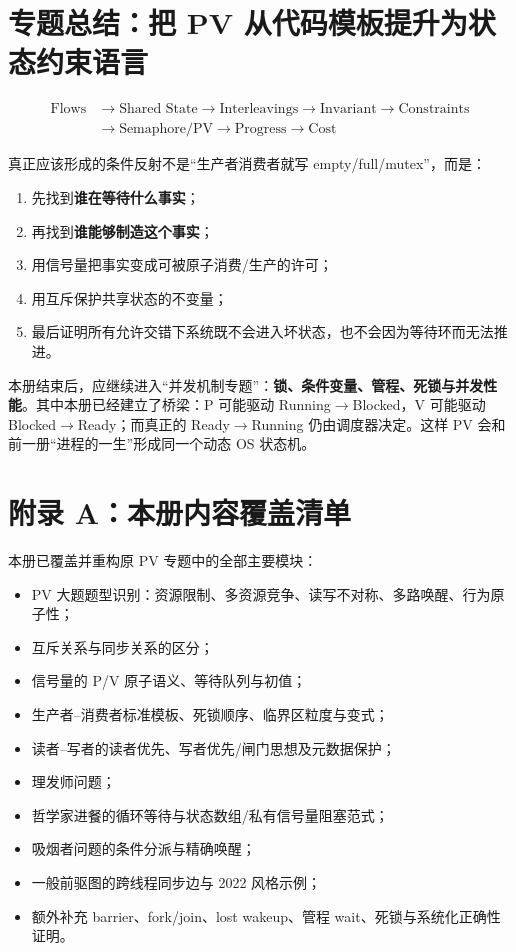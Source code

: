 \documentclass[11pt,a4paper]{ctexart}
\newcommand{\kw}[1]{\textbf{#1}}
\begin{document}
\section{专题总结：把 PV 从代码模板提升为状态约束语言}

\begin{corebox}[最终母模型]
\[
\boxed{
\begin{aligned}
\text{Flows}&\to\text{Shared State}\to\text{Interleavings}\to\text{Invariant}\to\text{Constraints}\\
&\to\text{Semaphore/PV}\to\text{Progress}\to\text{Cost}
\end{aligned}}
\]
\end{corebox}

真正应该形成的条件反射不是“生产者消费者就写 empty/full/mutex”，而是：
\begin{enumerate}
\item 先找到\kw{谁在等待什么事实}；
\item 再找到\kw{谁能够制造这个事实}；
\item 用信号量把事实变成可被原子消费/生产的许可；
\item 用互斥保护共享状态的不变量；
\item 最后证明所有允许交错下系统既不会进入坏状态，也不会因为等待环而无法推进。
\end{enumerate}

\begin{method}[与下一专题的接口]
本册结束后，应继续进入“并发机制专题”：\kw{锁、条件变量、管程、死锁与并发性能}。其中本册已经建立了桥梁：P 可能驱动 Running$\to$Blocked，V 可能驱动 Blocked$\to$Ready；而真正的 Ready$\to$Running 仍由调度器决定。这样 PV 会和前一册“进程的一生”形成同一个动态 OS 状态机。
\end{method}

\newpage
\section*{附录 A：本册内容覆盖清单}

本册已覆盖并重构原 PV 专题中的全部主要模块：
\begin{itemize}
\item PV 大题题型识别：资源限制、多资源竞争、读写不对称、多路唤醒、行为原子性；
\item 互斥关系与同步关系的区分；
\item 信号量的 P/V 原子语义、等待队列与初值；
\item 生产者--消费者标准模板、死锁顺序、临界区粒度与变式；
\item 读者--写者的读者优先、写者优先/闸门思想及元数据保护；
\item 理发师问题；
\item 哲学家进餐的循环等待与状态数组/私有信号量阻塞范式；
\item 吸烟者问题的条件分派与精确唤醒；
\item 一般前驱图的跨线程同步边与 2022 风格示例；
\item 额外补充 barrier、fork/join、lost wakeup、管程 wait、死锁与系统化正确性证明。
\end{itemize}
\end{document}
